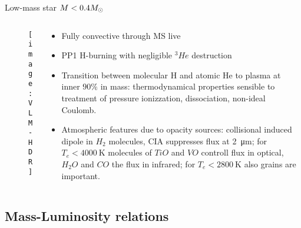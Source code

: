 \begin{frame}{Low-mass star $M<0.4M_{\odot}{}$}
\begin{columns}[T]\begin{column}{0.45\textwidth}
\begin{figure}[!ht]
\texttt{[image: VLM-HDR]}\label{fig:VLM-HDR}
\end{figure}
\end{column}
\begin{column}{0.47\textwidth}
\begin{itemize}
    \item Fully convective through MS live
    \item PP1 H-burning with negligible $^3He$ destruction
    \item Transition between molecular H and atomic He to plasma at inner $90\%$ in mass: thermodynamical properties sensible to treatment of pressure ionizzation, dissociation, non-ideal Coulomb.
    \item Atmospheric features due to opacity sources: collisional induced dipole in $H_2$ molecules, CIA suppresses flux at \SI{2}{\micro\meter}; for $T_e<\SI{4000}{\kelvin}$ molecules of $TiO$ and $VO$ controll flux in optical, $H_2O$ and $CO$ the flux in infrared; for $T_e<\SI{2800}{\kelvin}$ also grains are important.
\end{itemize}
\end{column}\end{columns}
\end{frame}

\subsection{Mass-Luminosity relations}

